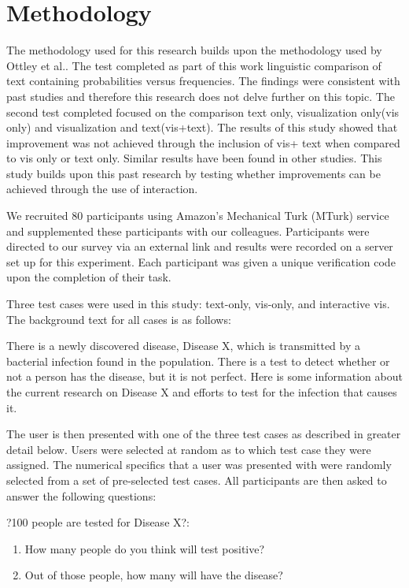 \section{Methodology}
The methodology used for this research builds upon the methodology used by
Ottley et al.\cite{Ottley2016}. The test completed as part of this work 
linguistic comparison of text containing probabilities versus frequencies.
The findings were consistent with past studies and therefore this research
does not delve further on this topic. The second test completed focused on
the comparison text only, visualization only(vis only) and visualization and
text(vis+text). The results of this study showed that improvement was not
achieved through the inclusion of vis+ text when compared to vis only or text
only. Similar results have been found in other studies. This study builds
upon this past research by testing whether improvements can be achieved
through the use of interaction.

We recruited 80 participants using Amazon's Mechanical Turk (MTurk) service and supplemented these participants with our colleagues. Participants were directed to our survey via an external link and results were recorded on a server set up for this experiment. Each participant was given a unique verification code upon the completion of their task. 

Three test cases were used in this study: text-only, vis-only, and interactive vis. The background text for all cases is as follows:

\begin{displayquote}
    There is a newly discovered disease, Disease X, which is transmitted by a bacterial infection found in the population. There is a test to detect whether or not a person has the disease, but it is not perfect. Here is some information about the current research on Disease X and efforts to test for the infection that causes it.
\end{displayquote}

The user is then presented with one of the three test cases as described in greater detail below. Users were selected at random as to which test case they were assigned. The numerical specifics that a user was presented with were randomly selected from a set of pre-selected test cases. All participants are then asked to answer the following questions:

?100 people are tested for Disease X?:
\begin{enumerate}
    \item How many people do you think will test positive?
    \item Out of those people, how many will have the disease? 
\end{enumerate}

